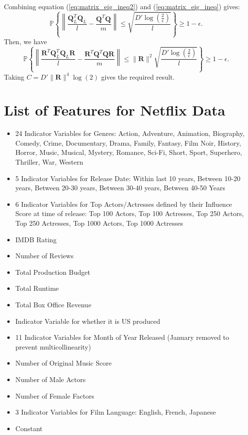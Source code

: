 \documentclass[twoside,11pt]{article}
\newcommand{\md}[1]{\mathbb{#1}}
\begin{document}
Combining equation (\ref{eq:matrix_eig_ineq2})
and (\ref{eq:matrix_eig_ineq}) gives:
\begin{equation}
\md{P}\left\{\left\|\frac{\bm{Q}_L^T\bm{Q}_L}{l}-\frac{\bm{Q}^T\bm{Q}}{m}\right\|\leq \sqrt{\frac{D'\log\left(\frac{2}{\epsilon}\right)}{l}}\right\}\geq 1 - \epsilon.
\end{equation}
Then, we have 
\begin{equation}
\md{P}\left\{\left\|\frac{\bm{R}^T\bm{Q}_L^T\bm{Q}_L\bm{R}}{l}-\frac{\bm{R}^T\bm{Q}^T\bm{Q}\bm{R}}{m}\right\|\leq \|\bm{R}\|^2\sqrt{\frac{D'\log\left(\frac{2}{\epsilon}\right)}{l}}\right\}\geq 1 - \epsilon.
\end{equation}
Taking $C=D'\|\bm{R}\|^4\log(2)$ gives the required result.
\endproof

\section{List of Features for Netflix Data}
\label{app:featurelist}
\begin{itemize}
    \item 24 Indicator Variables for Genres: Action, Adventure, Animation, Biography, Comedy, Crime, Documentary, Drama, Family, Fantasy, Film Noir, History, Horror, Music, Musical, Mystery, Romance, Sci-Fi, Short, Sport, Superhero, Thriller, War, Western
    \item 5 Indicator Variables for Release Date: Within last 10 years, Between 10-20 years, Between 20-30 years, Between 30-40 years, Between 40-50 Years
    \item 6 Indicator Variables for Top Actors/Actresses defined by their Influence Score at time of release: Top 100 Actors, Top 100 Actresses, Top 250 Actors, Top 250 Actresses, Top 1000 Actors, Top 1000 Actresses
    \item IMDB Rating
    \item Number of Reviews
    \item Total Production Budget
    \item Total Runtime
    \item Total Box Office Revenue
    \item Indicator Variable for whether it is US produced
    \item 11 Indicator Variables for Month of Year Released (January removed to prevent multicollinearity)
    \item Number of Original Music Score
    \item Number of Male Actors
    \item Number of Female Factors
    \item 3 Indicator Variables for Film Language: English, French, Japanese
    \item Constant 
\end{itemize}
\end{document}
